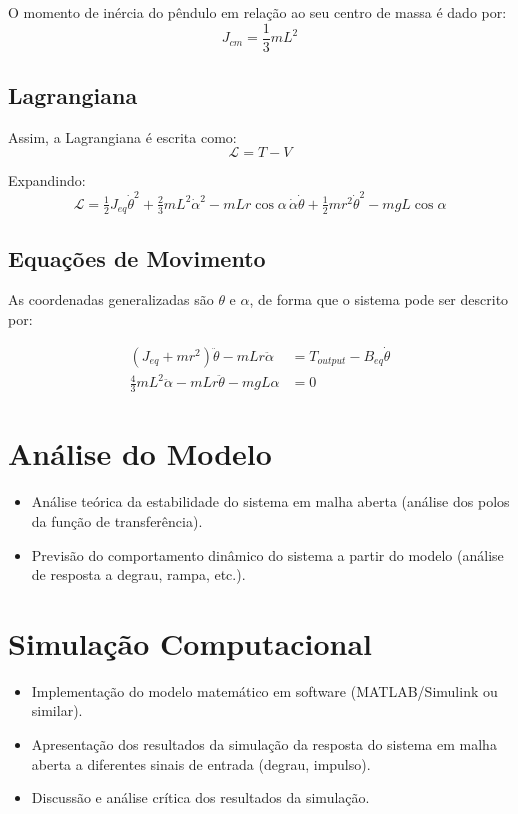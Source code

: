 \documentclass[9pt,a4paper,twocolumn,twoside]{tau-class/tau}
\begin{document}
O momento de inércia do pêndulo em relação ao seu centro de massa é dado por:
\begin{equation}
    J_{cm} = \frac{1}{3} m L^2
\end{equation}

\subsection{Lagrangiana}
Assim, a Lagrangiana é escrita como:
\begin{equation}
    \mathcal{L} = T - V
\end{equation}

Expandindo:
\begin{equation}
    \mathcal{L} = \tfrac{1}{2} J_{eq} \dot{\theta}^2 
        + \tfrac{2}{3} m L^2 \dot{\alpha}^2
        - m L r \cos \alpha \, \dot{\alpha}\dot{\theta}
        + \tfrac{1}{2} m r^2 \dot{\theta}^2
        - m g L \cos \alpha
\end{equation}

\subsection{Equações de Movimento}
As coordenadas generalizadas são $\theta$ e $\alpha$, de forma que o sistema 
pode ser descrito por:

\begin{align}
    (J_{eq} + m r^2)\ddot{\theta} - m L r \ddot{\alpha} 
    &= T_{output} - B_{eq} \dot{\theta} \\
    \tfrac{4}{3} m L^2 \ddot{\alpha} - m L r \ddot{\theta} - m g L \alpha &= 0
\end{align}


\section{Análise do Modelo}
\begin{itemize}
    \item Análise teórica da estabilidade do sistema em malha aberta (análise dos polos da função de transferência).
    \item Previsão do comportamento dinâmico do sistema a partir do modelo (análise de resposta a degrau, rampa, etc.).
\end{itemize}

\section{Simulação Computacional}
\begin{itemize}
    \item Implementação do modelo matemático em software (MATLAB/Simulink ou similar).
    \item Apresentação dos resultados da simulação da resposta do sistema em malha aberta a diferentes sinais de entrada (degrau, impulso).
    \item Discussão e análise crítica dos resultados da simulação.
\end{itemize}
\end{document}

